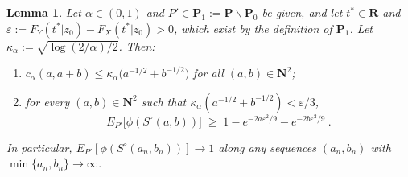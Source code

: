 \documentclass[11pt]{article}
\numberwithin{equation}{section}
\newtheorem{lemma}{Lemma}%
\begin{document}
\begin{lemma}\label{lem:ideal-power}
  Let $\alpha\in(0,1)$ and $P'\in\mathbf P_1:=\mathbf{P}\backslash\mathbf{P}_0$ be given, and let $t^*\in\mathbf R$ and
  $\varepsilon:=F_Y(t^*|z_0)-F_X(t^*|z_0)>0$, which exist by the definition of $\mathbf P_1$. Let
  $\kappa_\alpha:=\sqrt{\log(2/\alpha)/2}$. Then:
  \begin{enumerate}
  \item[(i)] $c_\alpha(a,a+b)\le \kappa_\alpha\big(a^{-1/2}+b^{-1/2}\big)$ for all
  $(a,b)\in\mathbf N^2$;
  \item[(ii)] for every $(a,b)\in\mathbf N^2$ such that
  $\kappa_\alpha(a^{-1/2}+b^{-1/2})<\varepsilon/3$,
  \begin{equation*}
   E_{P'}\big[\phi(S^{\circ}(a,b))\big]\;\ge\;1-e^{-2a\varepsilon^2/9}-e^{-2b\varepsilon^2/9}~.
  \end{equation*}
  \end{enumerate}
  In particular, $E_{P'}[\phi(S^{\circ}(a_n,b_n))]\to1$ along any sequences $(a_n,b_n)$ with
  $\min\{a_n,b_n\}\to\infty$.
  \end{lemma}
\end{document}

